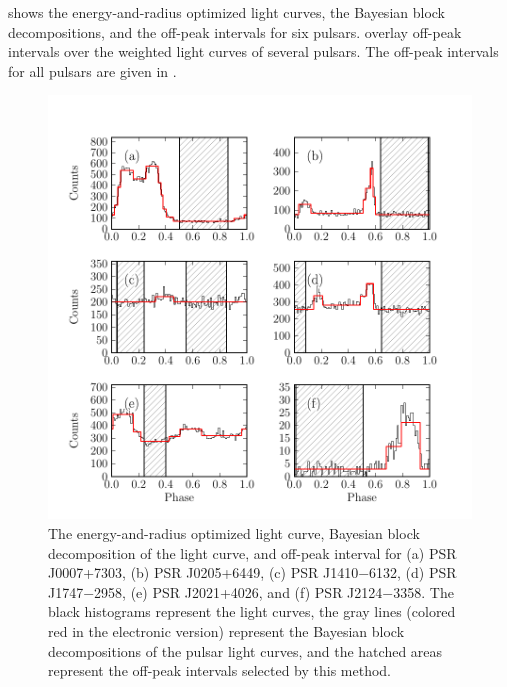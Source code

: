  shows the energy-and-radius optimized
light curves, the Bayesian block decompositions, 
and the off-peak intervals for six pulsars.  
\citep{abdo_2013a_second-fermi} overlay off-peak intervals
over the weighted light curves of several pulsars.
The off-peak intervals for all pulsars are given in 
\citep{abdo_2013a_second-fermi}.

\begin{figure}
  \includegraphics{chapters/offpeak/figures/off_peak_phase_color.pdf}
  \caption{The energy-and-radius optimized light curve, Bayesian block decomposition of the        
  light curve, and off-peak interval for
  (a) PSR J0007+7303, (b) PSR J0205+6449, (c) PSR J1410$-$6132,
  (d) PSR J1747$-$2958, (e) PSR J2021+4026, and (f) PSR J2124$-$3358.
  The black histograms represent the light curves,
  the gray lines (colored red in the electronic version)
  represent the Bayesian block decompositions of the pulsar light curves, and
  the hatched areas represent the off-peak intervals selected by this method.}
\end{figure}

